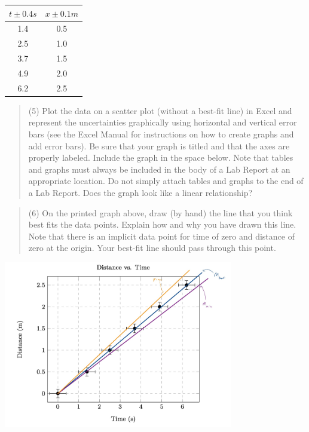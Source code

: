 \documentclass[8pt]{extarticle}
\begin{document}
\begin{center}
	\begin{tabular}{c|c}
		$t \pm 0.4s$ & $x \pm 0.1m$\\
		\hline
		1.4 & 0.5\\
		2.5 & 1.0 \\
		3.7 & 1.5\\
		4.9 & 2.0\\
		6.2 & 2.5
	\end{tabular}
\end{center}
\begin{quote}
	(5) Plot the data on a scatter plot (without a best-fit line) in Excel and represent the uncertainties graphically using horizontal and vertical error bars (see the Excel Manual for instructions on how to create graphs and add error bars). Be sure that your graph is titled and that the axes are properly labeled. Include the graph in the space below. Note that tables and graphs must always be included in the body of a Lab Report at an appropriate location.  Do not simply attach tables and graphs to the end of a Lab Report. Does the graph look like a linear relationship?
\end{quote}
\begin{center}
\end{center}
\begin{quote}
	(6) On the printed graph above, draw (by hand) the line that you think best fits the data points.  Explain how and why you have drawn this line. Note that there is an implicit data point for time of zero and distance of zero at the origin. Your best-fit line should pass through this point.
\end{quote}
\begin{center}
	\includegraphics[width=10cm]{Lab1Image1_2}
\end{center}
\end{document}
